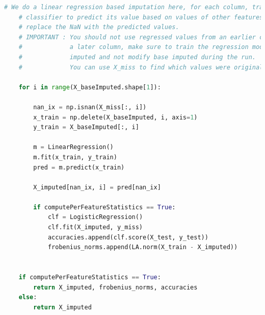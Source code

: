 \begin{itemize}
\begin{lstlisting}[language = Python, caption=regressedImpute method]
    # We do a linear regression based imputation here, for each column, train a 
    # classifier to predict its value based on values of other features and
    # replace the NaN with the predicted values. 
    # IMPORTANT : You should not use regressed values from an earlier column to predict 
    #             a later column, make sure to train the regression model on base 
    #             imputed and not modify base imputed during the run.
    #             You can use X_miss to find which values were originally NaNs.
    
    for i in range(X_baseImputed.shape[1]):
        
        nan_ix = np.isnan(X_miss[:, i])
        x_train = np.delete(X_baseImputed, i, axis=1)
        y_train = X_baseImputed[:, i]
        
        m = LinearRegression()
        m.fit(x_train, y_train)
        pred = m.predict(x_train)
        
        X_imputed[nan_ix, i] = pred[nan_ix]

        if computePerFeatureStatistics == True:
            clf = LogisticRegression()
            clf.fit(X_imputed, y_miss)
            accuracies.append(clf.score(X_test, y_test))
            frobenius_norms.append(LA.norm(X_train - X_imputed))
            

    if computePerFeatureStatistics == True:
        return X_imputed, frobenius_norms, accuracies
    else:
        return X_imputed
\end{lstlisting}
\end{itemize}


